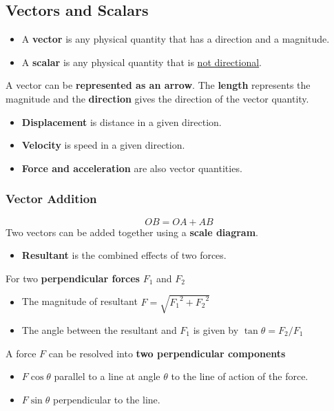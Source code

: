 \subsection{Vectors and Scalars}

\begin{itemize}
    \item A \textbf{vector} is any physical quantity that has a direction and a magnitude.
    \item A \textbf{scalar} is any physical quantity that is \underline{not directional}.
\end{itemize}

A vector can be \textbf{represented as an arrow}. The \textbf{length} represents the magnitude and the \textbf{direction} gives the direction of the vector quantity.
\begin{itemize}
    \item \textbf{Displacement} is distance in a given direction.
    \item \textbf{Velocity} is speed in a given direction.
    \item \textbf{Force and acceleration} are also vector quantities.
\end{itemize}

\subsubsection*{Vector Addition}
$$OB=OA+AB$$
Two vectors can be added together using a \textbf{scale diagram}.
\begin{itemize}
    \item \textbf{Resultant} is the combined effects of two forces.
\end{itemize}

For two \textbf{perpendicular forces} $F_1$ and $F_2$
\begin{itemize}
    \item The magnitude of resultant $F=\sqrt{{F_1}^2+{F_2}^2}$
    \item The angle between the resultant and $F_1$ is given by $\tan\theta=F_2/F_1$
\end{itemize}

A force $F$ can be resolved into \textbf{two perpendicular components}
\begin{itemize}
    \item $F\cos\theta$ parallel to a line at angle $\theta$ to the line of action of the force.
    \item $F\sin\theta$ perpendicular to the line.
\end{itemize}
